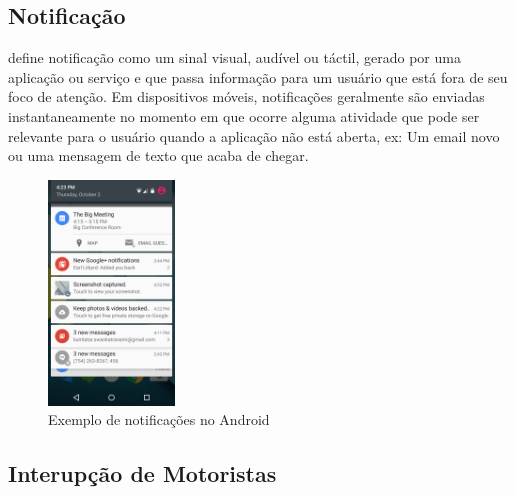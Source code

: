 \subsection{Notificação}
\label{notificacao}

\cite{iqbal2010notifications} define notificação como um sinal visual, audível ou táctil, gerado por uma aplicação
ou serviço e que passa informação para um usuário que está fora de seu foco de atenção. Em dispositivos móveis,
notificações geralmente são enviadas instantaneamente no momento em que ocorre alguma atividade que pode ser relevante
para o usuário quando a aplicação não está aberta, ex: Um email novo ou uma mensagem de texto que acaba de chegar.

\begin{figure}[h]
\centering
\includegraphics[width=0.3\textwidth]{imagens/notification_drawer.png}
\caption{Exemplo de notificações no Android \cite{notificationDrawer}}
\label{notification-drawer}
\end{figure}

\subsection{Interupção de Motoristas}
\label{interrupcao-motoristas}
